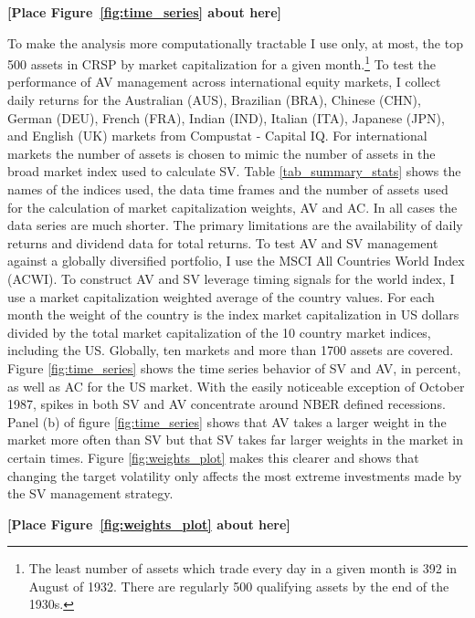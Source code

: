 \bigskip
\centerline{\bf [Place Figure~\ref{fig:time_series} about here]}
\bigskip
To make the analysis more computationally tractable I use only, at most, the top 500 assets in CRSP by market capitalization for a given month.\footnote{The least number of assets which trade every day in a given month is 392 in August of 1932. There are regularly 500 qualifying assets by the end of the 1930s.} To test the performance of AV management across international equity markets, I collect daily returns for the Australian (AUS), Brazilian (BRA), Chinese (CHN), German (DEU), French (FRA), Indian (IND), Italian (ITA), Japanese (JPN), and English (UK) markets from Compustat - Capital IQ. For international markets the number of assets is chosen to mimic the number of assets in the broad market index used to calculate SV.  Table \ref{tab_summary_stats} shows the names of the indices used, the data time frames and the number of assets used for the calculation of market capitalization weights, AV and AC. In all cases the data series are much shorter. The primary limitations are the availability of daily returns and dividend data for total returns. To test AV and SV management against a globally diversified portfolio, I use the MSCI All Countries World Index (ACWI). To construct AV and SV leverage timing signals for the world index, I use a market capitalization weighted average of the country values. For each month the weight of the country is the index market capitalization in US dollars divided by the total market capitalization of the 10 country market indices, including the US. Globally, ten markets and more than 1700 assets are covered. 
Figure \ref{fig:time_series} shows the time series behavior of SV and AV, in percent, as well as
AC for the US market. With the easily noticeable exception of October 1987, spikes in both SV and AV concentrate around NBER defined recessions. Panel (b) of figure \ref{fig:time_series} shows that AV takes a larger weight in the market more often than SV but that SV takes far larger weights in the market in certain times. Figure \ref{fig:weights_plot} makes this clearer and shows that changing the target volatility only affects the most extreme investments made by the SV management strategy.\\
\bigskip
\centerline{\bf [Place Figure~\ref{fig:weights_plot} about here]}
\bigskip

